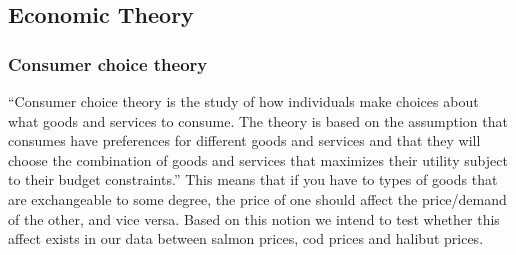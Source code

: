 \subsection{Economic Theory}
\subsubsection{Consumer choice theory}
``Consumer choice theory is the study of how individuals make choices about what goods and services to consume. The theory is based on the assumption that consumes have preferences for different goods and services and that they will choose the combination of goods and services that maximizes their utility subject to their budget constraints.'' \parencite{Perloff_2017} This means that if you have to types of goods that are exchangeable to some degree, the price of one should affect the price/demand of the other, and vice versa. Based on this notion we intend to test whether this affect exists in our data between salmon prices, cod prices and halibut prices.